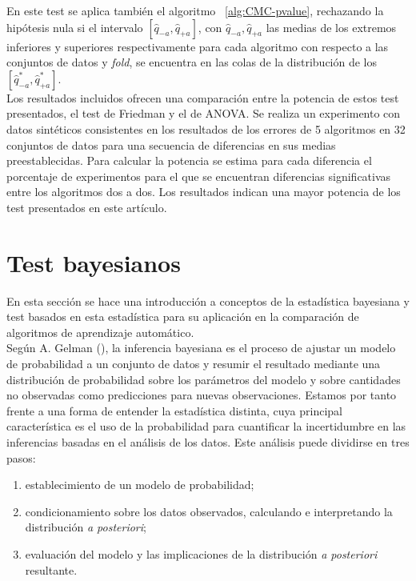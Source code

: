 	En este test se aplica también el algoritmo 
~\ref{alg:CMC-pvalue}, rechazando la hipótesis nula si el 
intervalo $[\hat{q}_{-a}, \hat{q}_{+a}]$, con $\hat{q}_{-a}, 
\hat{q}_{+a}$ las medias de los extremos inferiores y 
superiores respectivamente para cada algoritmo con respecto a 
las conjuntos de datos y \textit{fold}, se encuentra en las colas 
de la distribución de los $[\hat{q}_{-a}^*, \hat{q}_{+a}^*]$.
\\
	Los resultados incluidos ofrecen una comparación entre la 
potencia de estos test presentados, el test de Friedman y el 
de ANOVA. Se realiza un experimento con datos sintéticos 
consistentes en los resultados de los errores de 5 algoritmos 
en 32 conjuntos de datos para una secuencia de diferencias en sus 
medias preestablecidas. Para calcular la potencia se estima 
para cada diferencia el porcentaje de experimentos para el 
que se encuentran diferencias significativas entre los 
algoritmos dos a dos. Los resultados indican una mayor 
potencia de los test presentados en este artículo.


\section{Test bayesianos}	

	En esta sección se hace una introducción a conceptos de 
la estadística bayesiana y test basados en esta estadística
para su aplicación en la comparación de algoritmos de
aprendizaje automático.\\
	Según A. Gelman (\cite{GELMAN14}), la inferencia 
bayesiana es el proceso de ajustar un modelo de probabilidad 
a un conjunto de datos y resumir el resultado  mediante una 
distribución de probabilidad sobre los  parámetros del modelo 
y sobre cantidades no observadas como predicciones para 
nuevas observaciones. Estamos por tanto frente a una 
forma de entender la estadística distinta, cuya principal
característica es el uso de la probabilidad para 
cuantificar la incertidumbre en las inferencias basadas en
el análisis de los datos. Este análisis puede dividirse en
tres pasos:

	\begin{enumerate}
	\item establecimiento de un modelo de probabilidad;
	\item condicionamiento sobre los datos observados,
		calculando e interpretando la distribución 
		\textit{a posteriori};
	\item evaluación del modelo y las implicaciones de la
		distribución \textit{a posteriori} resultante.
	\end{enumerate}

